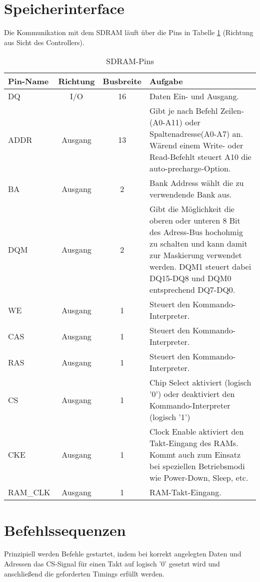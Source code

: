 \section{Speicherinterface}
Die Kommunikation mit dem SDRAM läuft über die Pins in Tabelle \ref{tab:RAM-P} (Richtung aus Sicht des Controllers).
\begin{table}[h!]
\caption{SDRAM-Pins}
\label{tab:RAM-P}
\centering
\setlength{\tabcolsep}{1ex}
\def\arraystretch{1.20}
\setlength{\tabcolsep}{1ex}
\small
\begin{tabular}{|l|c|c|p{7cm}|}
\hline 
Pin-Name & Richtung & Busbreite & Aufgabe \\ 
\hline 
DQ & I/O & 16 & Daten Ein- und Ausgang. \\ 
\hline 
ADDR & Ausgang & 13 & Gibt je nach Befehl Zeilen-(A0-A11) oder Spaltenadresse(A0-A7) an. Wärend einem Write- oder Read-Befehlt steuert A10 die auto-precharge-Option. \\ 
\hline 
BA & Ausgang & 2 & Bank Address wählt die zu verwendende Bank aus. \\ 
\hline 
DQM & Ausgang & 2 & Gibt die Möglichkeit die oberen oder unteren 8 Bit des Adress-Bus hochohmig zu schalten und kann damit zur Maskierung verwendet werden. DQM1 steuert dabei DQ15-DQ8 und DQM0 entsprechend DQ7-DQ0.\\ 
\hline 
WE & Ausgang & 1 & Steuert den Kommando-Interpreter.\\ 
\hline 
CAS & Ausgang & 1 & Steuert den Kommando-Interpreter. \\ 
\hline 
RAS & Ausgang & 1 & Steuert den Kommando-Interpreter. \\ 
\hline 
CS & Ausgang & 1 & Chip Select aktiviert (logisch '0') oder deaktiviert den Kommando-Interpreter (logisch '1')\\ 
\hline 
CKE & Ausgang & 1 & Clock Enable aktiviert den Takt-Eingang des RAMs. Kommt auch zum Einsatz bei speziellen Betriebsmodi wie Power-Down, Sleep, etc. \\
\hline 
RAM\_CLK & Ausgang & 1 & RAM-Takt-Eingang. \\
\hline 
\end{tabular} 
\end{table}


\section{Befehlssequenzen}
Prinzipiell werden Befehle gestartet, indem bei korrekt angelegten Daten und Adressen das CS-Signal für einen Takt auf logisch '0' gesetzt wird und anschließend die geforderten Timings erfüllt werden.

